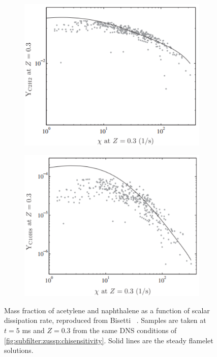 \begin{figure}[ht]
  \centering
  \begin{subfigure}[b]{0.375\linewidth}
    \centering
    \includegraphics[width=\linewidth]{ch-transport/figures/dns-YC2H2vschi}
  \end{subfigure}%
  \begin{subfigure}[b]{0.375\linewidth}
    \centering
    \includegraphics[width=\linewidth]{ch-transport/figures/dns-YC10H8vschi}
  \end{subfigure}
  \caption[Effects of Scalar Dissipation Rate on $Y_{\ce{C2H2}}$ and $Y_{\ce{C10H8}}$]{Mass fraction of acetylene and naphthalene as a function of scalar dissipation rate, reproduced from Bisetti \etal~\cite{bisetti2012}. Samples are taken at $t = 5$ ms and $Z = 0.3$ from the same DNS conditions of \cref{fig:subfilter:zussp:chisensitivity}. Solid lines are the steady flamelet solutions.}
  \label{fig:transport:overview:pah:unsteadypah}
\end{figure} 

